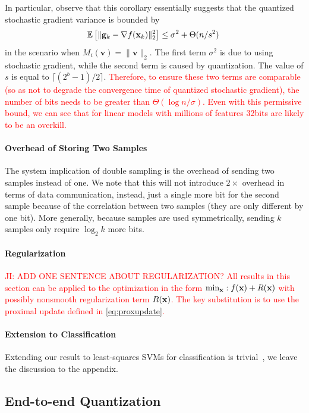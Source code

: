 \documentclass{article}
\renewcommand{\vec}[1]{\mathbf{#1}}
\def\g{{\bf g}}
\def\x{{\bf x}}
\def\E{\mathbb{E}}
\begin{document}
In particular, observe that this corollary essentially suggests that the quantized stochastic gradient variance is bounded by
\[
\E \left[ \| \g_k - \nabla f(\x_k) \|_2^2 \right] \leq \sigma^2 + \Theta(n/s^2) \;
\]
in the scenario when $M_i (\vec{v}) = \| \vec{v} \|_2 $.
The first term $\sigma^2$ is due to using stochastic gradient, while the second term is caused by quantization. The value of $s$ is equal to  $\lceil(2^b - 1) / 2\rceil$. \textcolor{red}{Therefore, to ensure these two terms are comparable (so as not to degrade the convergence time of quantized stochastic gradient), the number of bits needs to be greater than $\Theta(\log n / \sigma)$. Even with this permissive
bound, we can see that for linear models with millions
of features 32bits are likely to be an overkill.}

\paragraph*{Overhead of Storing Two Samples}
The system implication of double sampling is the overhead of sending
two samples instead of one. We note that this will not introduce $2\times$
overhead in terms of data communication, instead, just a single more bit
for the second sample because of the correlation between two samples (they 
are only different by one bit). More generally, because samples
are used symmetrically, sending $k$ samples only require $\log_2 k$ more bits.


\paragraph*{Regularization}

\textcolor{red}{JI: ADD ONE SENTENCE ABOUT REGULARIZATION?}
\textcolor{red}{All results in this section can be applied to the optimization in the form $\min_{\x}: f(\x) + R(\x)$ with possibly nonsmooth regularization term $R(\x)$. The key substitution is to use the proximal update defined in \eqref{eq:proxupdate}.}

\paragraph*{Extension to Classification}

Extending our result to least-squares SVMs for classification
is trivial~\cite{SvmVsLssvm}, we leave the discussion to the
appendix.


\subsection{End-to-end Quantization}
\end{document}
